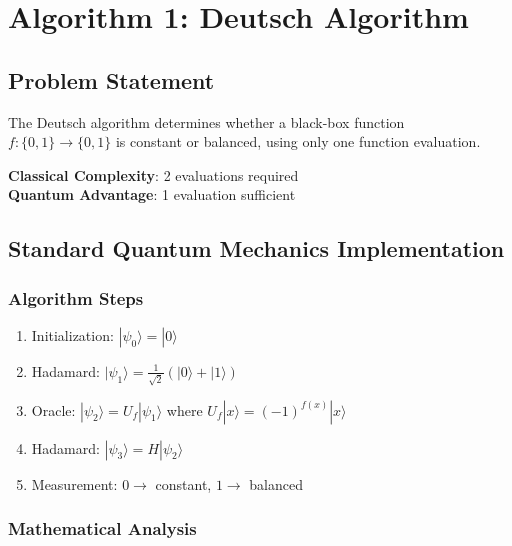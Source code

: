 	\section{Algorithm 1: Deutsch Algorithm}
	
	\subsection{Problem Statement}
	
	The Deutsch algorithm determines whether a black-box function $f: \{0,1\} \rightarrow \{0,1\}$ is constant or balanced, using only one function evaluation.
	
	\textbf{Classical Complexity}: 2 evaluations required \\
	\textbf{Quantum Advantage}: 1 evaluation sufficient
	
	\subsection{Standard Quantum Mechanics Implementation}
	
	\subsubsection{Algorithm Steps}
	\begin{enumerate}
		\item Initialization: $|\psi_0\rangle = |0\rangle$
		\item Hadamard: $|\psi_1\rangle = \frac{1}{\sqrt{2}}(|0\rangle + |1\rangle)$
		\item Oracle: $|\psi_2\rangle = U_f|\psi_1\rangle$ where $U_f|x\rangle = (-1)^{f(x)}|x\rangle$
		\item Hadamard: $|\psi_3\rangle = H|\psi_2\rangle$
		\item Measurement: $0 \rightarrow$ constant, $1 \rightarrow$ balanced
	\end{enumerate}
	
	\subsubsection{Mathematical Analysis}
	

